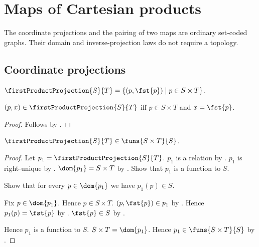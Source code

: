 \section{Maps of Cartesian products}





The coordinate projections and the pairing of two maps are ordinary set-coded
graphs. Their domain and inverse-projection laws do not require a topology.

\subsection{Coordinate projections}

\begin{definition}\label{first_product_projection}
    $\firstProductProjection{S}{T}
        =\{(p,\fst{p})\mid p\in S\times T\}$.
\end{definition}

\begin{proposition}\label{first_product_projection_iff}
    $(p,x)\in\firstProductProjection{S}{T}$ iff
        $p\in S\times T$ and $x=\fst{p}$.
\end{proposition}
\begin{proof}
    Follows by .
\end{proof}

\begin{proposition}\label{first_product_projection_type}
    $\firstProductProjection{S}{T}\in\funs{S\times T}{S}$.
\end{proposition}
\begin{proof}
    Let $p_1=\firstProductProjection{S}{T}$.
    $p_1$ is a relation by .
    $p_1$ is right-unique by
        .
    $\dom{p_1}=S\times T$ by
        .
    Show that $p_1$ is a function to $S$.
    \begin{subproof}
        Show that for every $p\in\dom{p_1}$ we have $p_1(p)\in S$.
        \begin{subproof}
            Fix $p\in\dom{p_1}$.
            Hence $p\in S\times T$.
            $(p,\fst{p})\in p_1$ by
                .
            Hence $p_1(p)=\fst{p}$ by .
            $\fst{p}\in S$ by .
        \end{subproof}
    \end{subproof}
    Hence $p_1$ is a function to $S$.
    $S\times T=\dom{p_1}$.
    Hence $p_1\in\funs{S\times T}{S}$ by .
\end{proof}

